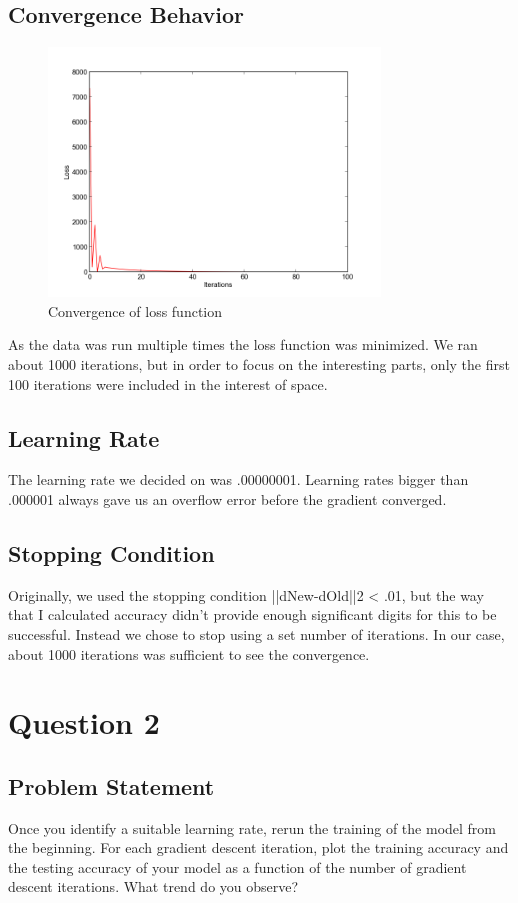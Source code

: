 \documentclass[letterpaper,10pt]{article}
\begin{document}
\subsection{Convergence Behavior}
     \begin{figure}[ht]
    \centering
   \includegraphics[width=250pt]{convergenceClose1.png}
    \caption{Convergence of loss function}
    \label{fig:Convergence of loss function over iterations}
    \end{figure}
As the data was run multiple times the loss function was minimized.
We ran about 1000 iterations, but in order to focus on the interesting parts, only the first 100 iterations were included in the interest of space.   

\subsection{Learning Rate}
The learning rate we decided on was .00000001. 
Learning rates bigger than .000001 always gave us an overflow error before the gradient converged.
\subsection{Stopping Condition}
Originally, we used the stopping condition ||dNew-dOld||2 < .01, but the way that I calculated accuracy didn't provide enough significant digits for this to be successful.
Instead we chose to stop using a set number of iterations. In our case, about 1000 iterations was sufficient to see the convergence.  

\section{Question 2}
\subsection{Problem Statement}
Once you identify a suitable learning rate, rerun the training of the model from the beginning. For 
each gradient descent iteration, plot the training accuracy and the testing accuracy of your model 
as a function of the number of gradient descent iterations. What trend do you observe?
\end{document}
